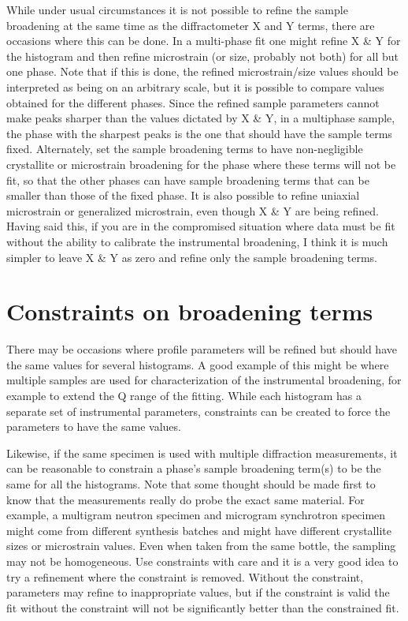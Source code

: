  While under usual circumstances it is not possible to refine the sample broadening at the same time as the diffractometer X and Y terms, there are occasions where this can be done. In a multi-phase fit one might refine X \& Y for the histogram and then refine microstrain (or size, probably not both) for all but one phase. Note that if this is done, the refined microstrain/size values should be interpreted as being on an arbitrary scale, but it is possible to compare values obtained for the different phases. Since the refined sample parameters cannot make peaks sharper than the values dictated by X \& Y, in a multiphase sample, the phase with the sharpest peaks is the one that should have the sample terms fixed. Alternately, set the sample broadening terms to have non-negligible crystallite or microstrain broadening for the phase where these terms will not be fit, so that the other phases can have sample broadening terms that can be smaller than those of the fixed phase. It is also possible to refine uniaxial microstrain or generalized microstrain, even though X \& Y are being refined. Having said this, if you are in the compromised situation where data must be fit without the ability to calibrate the instrumental broadening, I think it is much simpler to leave X \& Y as zero and refine only the sample broadening terms. 

 

\section{Constraints on broadening terms}

There may be occasions where profile parameters will be refined but should have the same values for several histograms. A good example of this might be where multiple samples are used for characterization of the instrumental broadening, for example to extend the Q range of the fitting. While each histogram has a separate set of instrumental parameters, constraints can be created to force the parameters to have the same values. 

Likewise, if the same specimen is used with multiple diffraction measurements, it can be reasonable to constrain a phase’s sample broadening term(s) to be the same for all the histograms. Note that some thought should be made first to know that the measurements really do probe the exact same material. For example, a multigram neutron specimen and microgram synchrotron specimen might come from different synthesis batches and might have different crystallite sizes or microstrain values. Even when taken from the same bottle, the sampling may not be homogeneous. Use constraints with care and it is a very good idea to try a refinement where the constraint is removed. Without the constraint, parameters may refine to inappropriate values, but if the constraint is valid the fit without the constraint will not be significantly better than the constrained fit. 


